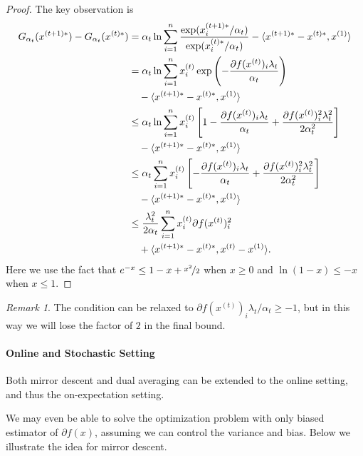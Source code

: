 \documentclass[openany]{book}
\theoremstyle{definition}
\theoremstyle{remark}
\newtheorem*{remark}{Remark}
\begin{document}
\begin{proof}
    The key observation is
    \begin{align*}
        G_{\alpha_t}(x^{(t+1)*})-G_{\alpha_t}(x^{(t)*}) & =\alpha_t\ln \sum_{i=1}^{n}\frac{\exp(x^{(t+1)*}_i/\alpha_t)}{\exp(x^{(t)*}_i/\alpha_t)}-\langle x^{(t+1)*}-x^{(t)*},x^{(1)}\rangle \\
         & =\alpha_t\ln \sum_{i=1}^{n}x^{(t)}_i\exp\del{-\frac{\partial f(x^{(t)})_i\lambda_t}{\alpha_t}} \\
         & \quad-\langle x^{(t+1)*}-x^{(t)*},x^{(1)}\rangle \\
         & \le\alpha_t\ln \sum_{i=1}^{n}x^{(t)}_i\sbr{1-\frac{\partial f(x^{(t)})_i\lambda_t}{\alpha_t}+\frac{\partial f(x^{(t)})^2_i\lambda_t^2}{2\alpha_t^2}} \\
         & \quad-\langle x^{(t+1)*}-x^{(t)*},x^{(1)}\rangle \\
         & \le\alpha_t \sum_{i=1}^{n}x^{(t)}_i\sbr{-\frac{\partial f(x^{(t)})_i\lambda_t}{\alpha_t}+\frac{\partial f(x^{(t)})^2_i\lambda_t^2}{2\alpha_t^2}} \\
         & \quad-\langle x^{(t+1)*}-x^{(t)*},x^{(1)}\rangle \\
         & \le \frac{\lambda_t^2}{2\alpha_t} \sum_{i=1}^{n}x^{(t)}_i\partial f(x^{(t)})_i^2 \\
         & \quad+\langle x^{(t+1)*}-x^{(t)*},x^{(t)}-x^{(1)}\rangle. \\
    \end{align*}
    Here we use the fact that $e^{-x}\le1-x+\nicefrac{x^2}{2}$ when $x\ge0$ and $\ln(1-x)\le-x$ when $x\le1$.
\end{proof}
\begin{remark}
    The condition can be relaxed to $\partial f(x^{(t)})_i\lambda_t/\alpha_t\ge-1$, but in this way we will lose the factor of $2$ in the final bound.
\end{remark}

\paragraph{Online and Stochastic Setting}
Both mirror descent and dual averaging can be extended to the online setting, and thus the on-expectation setting.

We may even be able to solve the optimization problem with only biased estimator of $\partial f(x)$, assuming we can control the variance and bias. Below we illustrate the idea for mirror descent.
\end{document}
